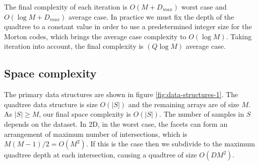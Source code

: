 \documentclass[final,3p,times,twocolumn]{elsarticle}
\begin{document}
The final complexity of each iteration is $O(M+D_{max})$ worst case and $O(\log{M}+D_{max})$ average case. In practice we must fix the depth of the quadtree to a constant value in order to use a predetermined integer size for the Morton codes, which brings the average case complexity to $O(\log{M})$. Taking iteration into account, the final complexity is $(Q\log{M})$ average case.

\subsection*{Space complexity}

The primary data structures are shown in figure \ref{fig:data-structures-1}. The quadtree data structure is size $O(|S|)$ and the remaining arrays are of size $M$. As $|S| \ge M$, our final space complexity is $O(|S|)$. The number of samples in $S$ depends on the dataset. In 2D, in the worst case, the facets can form an arrangement of maximum number of intersections, which is $M(M-1)/2 = O(M^2)$. If this is the case then we subdivide to the maximum quadtree depth at each intersection, causing a quadtree of size $O(DM^2)$. %
\end{document}
